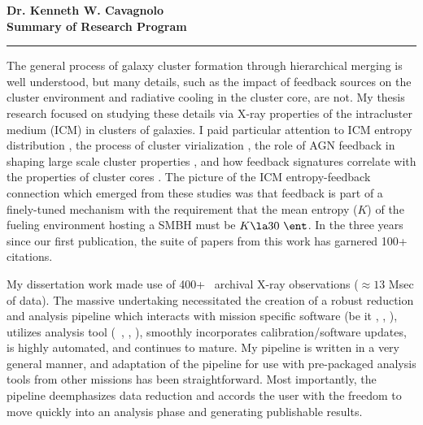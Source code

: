 \documentclass[11pt]{article}
\begin{document}
\begin{center}
{\large \textbf{Dr. Kenneth W. Cavagnolo\\Summary of Research Program}}
\rule{17cm}{2pt}
\end{center}
\normalsize

The general process of galaxy cluster formation through hierarchical
merging is well understood, but many details, such as the impact of
feedback sources on the cluster environment and radiative cooling in
the cluster core, are not. My thesis research focused on studying
these details via X-ray properties of the intracluster medium (ICM) in
clusters of galaxies. I paid particular attention to ICM entropy
distribution \cite{d06, accept}, the process of cluster virialization
\cite{xrayband}, the role of AGN feedback in shaping large scale
cluster properties \cite{conduction}, and how feedback signatures
correlate with the properties of cluster cores \cite{haradent}. The
picture of the ICM entropy-feedback connection which emerged from
these studies was that feedback is part of a finely-tuned mechanism
with the requirement that the mean entropy ($K$) of the fueling
environment hosting a SMBH must be $K \la 30~\ent$. In the three years
since our first publication, the suite of papers from this work has
garnered 100+ citations.

My dissertation work made use of 400+ \chandra\ archival X-ray
observations ($\approx 13$ Msec of data). The massive undertaking
necessitated the creation of a robust reduction and analysis pipeline
which interacts with mission specific software (be it \chandra, \xmm,
\suzaku), utilizes analysis tool (\eg\ \xspec, \idl, \iraf), smoothly
incorporates calibration/software updates, is highly automated, and
continues to mature. My pipeline is written in a very general manner,
and adaptation of the pipeline for use with pre-packaged analysis
tools from other missions has been straightforward. Most importantly,
the pipeline deemphasizes data reduction and accords the user with the
freedom to move quickly into an analysis phase and generating
publishable results.
\end{document}
